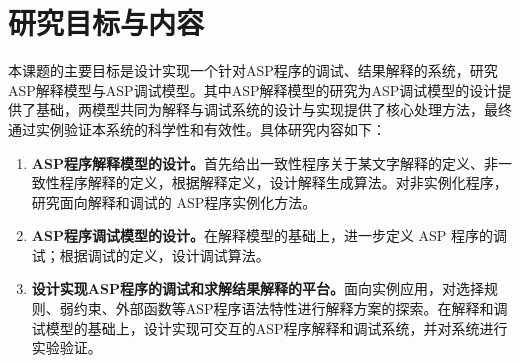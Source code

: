 \section{研究目标与内容}
本课题的主要目标是设计实现一个针对ASP程序的调试、结果解释的系统，研究ASP解释模型与ASP调试模型。其中ASP解释模型的研究为ASP调试模型的设计提供了基础，两模型共同为解释与调试系统的设计与实现提供了核心处理方法，最终通过实例验证本系统的科学性和有效性。具体研究内容如下：
\begin{enumerate}[label=(\arabic*),topsep=0pt]
    \setlength\itemsep{-0.3em}
    \item \textbf{ASP程序解释模型的设计。}首先给出一致性程序关于某文字解释的定义、非一致性程序解释的定义，根据解释定义，设计解释生成算法。对非实例化程序，研究面向解释和调试的 ASP程序实例化方法。
    \item \textbf{ASP程序调试模型的设计。}在解释模型的基础上，进一步定义 ASP 程序的调试；根据调试的定义，设计调试算法。
    \item \textbf{设计实现ASP程序的调试和求解结果解释的平台。}面向实例应用，对选择规则、弱约束、外部函数等ASP程序语法特性进行解释方案的探索。在解释和调试模型的基础上，设计实现可交互的ASP程序解释和调试系统，并对系统进行实验验证。
\end{enumerate}
